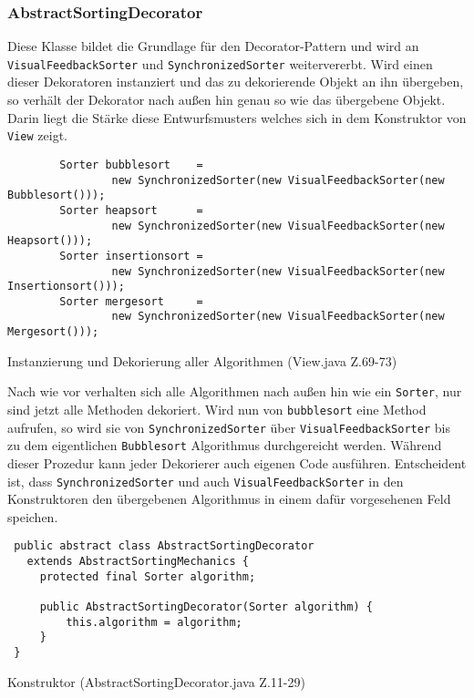 \subsubsection{AbstractSortingDecorator}
Diese Klasse bildet die Grundlage für den Decorator-Pattern und wird an \newline \texttt{VisualFeedbackSorter} und \texttt{SynchronizedSorter} weitervererbt.
Wird einen dieser Dekoratoren instanziert und das zu dekorierende Objekt an ihn übergeben, so verhält der Dekorator nach außen hin 
genau so wie das übergebene Objekt. Darin liegt die Stärke diese Entwurfsmusters welches sich in dem Konstruktor von \texttt{View} zeigt.
\newpage
{}
\begin{listing}
    \begin{verbatim}
        Sorter bubblesort    = 
                new SynchronizedSorter(new VisualFeedbackSorter(new Bubblesort()));
        Sorter heapsort      = 
                new SynchronizedSorter(new VisualFeedbackSorter(new Heapsort()));
        Sorter insertionsort = 
                new SynchronizedSorter(new VisualFeedbackSorter(new Insertionsort()));
        Sorter mergesort     = 
                new SynchronizedSorter(new VisualFeedbackSorter(new Mergesort()));    
    \end{verbatim}
    \caption{Instanzierung und Dekorierung aller Algorithmen (View.java Z.69-73)}
    \label{code:app:startup}
\end{listing}

Nach wie vor verhalten sich alle Algorithmen nach außen hin wie ein \texttt{Sorter}, nur sind jetzt alle Methoden dekoriert. Wird nun von 
\texttt{bubblesort} eine Method aufrufen, so wird sie von \texttt{SynchronizedSorter} über \texttt{VisualFeedbackSorter} bis zu dem eigentlichen \texttt{Bubblesort}
Algorithmus durchgereicht werden. Während dieser Prozedur kann jeder Dekorierer auch eigenen Code ausführen.
Entscheident ist, dass \texttt{SynchronizedSorter} und auch \texttt{VisualFeedbackSorter} in den Konstruktoren den übergebenen Algorithmus in 
einem dafür vorgesehenen Feld speichen.
\begin{listing}
    \begin{verbatim}
 public abstract class AbstractSortingDecorator 
   extends AbstractSortingMechanics {
     protected final Sorter algorithm;

     public AbstractSortingDecorator(Sorter algorithm) {
         this.algorithm = algorithm;
     }
 } 
    \end{verbatim}
    \caption{ Konstruktor (AbstractSortingDecorator.java Z.11-29)}
    \label{code:app:startup}
\end{listing}

